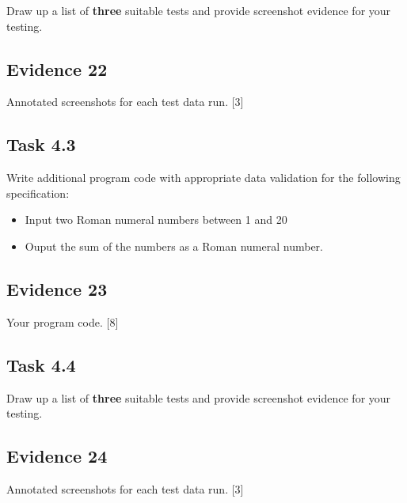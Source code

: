 Draw up a list of \textbf{three} suitable tests and provide screenshot
evidence for your testing.

\subsection*{Evidence 22 }

Annotated screenshots for each test data run.\hfill{} {[}3{]}

\subsection*{Task 4.3}

Write additional program code with appropriate data validation for
the following specification:
\begin{itemize}
\item Input two Roman numeral numbers between 1 and 20 
\item Ouput the sum of the numbers as a Roman numeral number.
\end{itemize}

\subsection*{Evidence 23 }

Your program code.\hfill{} {[}8{]}

\subsection*{Task 4.4 }

Draw up a list of \textbf{three} suitable tests and provide screenshot
evidence for your testing. 

\subsection*{Evidence 24 }

Annotated screenshots for each test data run. \hfill{}{[}3{]}